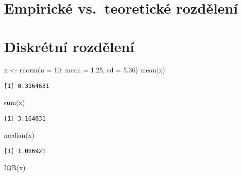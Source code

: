 \documentclass[
  letterpaper,
  DIV=11,
  numbers=noendperiod]{scrreprt}
\newenvironment{Shaded}{\begin{snugshade}}{\end{snugshade}}
\newcommand{\AttributeTok}[1]{\textcolor[rgb]{0.40,0.45,0.13}{#1}}
\newcommand{\DecValTok}[1]{\textcolor[rgb]{0.68,0.00,0.00}{#1}}
\newcommand{\FloatTok}[1]{\textcolor[rgb]{0.68,0.00,0.00}{#1}}
\newcommand{\FunctionTok}[1]{\textcolor[rgb]{0.28,0.35,0.67}{#1}}
\newcommand{\NormalTok}[1]{\textcolor[rgb]{0.00,0.23,0.31}{#1}}
\newcommand{\OtherTok}[1]{\textcolor[rgb]{0.00,0.23,0.31}{#1}}
\begin{document}
\hypertarget{empirickuxe9-vs.-teoretickuxe9-rozdux11blenuxed}{%
\section{Empirické vs.~teoretické
rozdělení}\label{empirickuxe9-vs.-teoretickuxe9-rozdux11blenuxed}}

\hypertarget{diskruxe9tnuxed-rozdux11blenuxed}{%
\section{Diskrétní rozdělení}\label{diskruxe9tnuxed-rozdux11blenuxed}}

\begin{Shaded}
\begin{Highlighting}[]
\NormalTok{x }\OtherTok{\textless{}{-}} \FunctionTok{rnorm}\NormalTok{(}\AttributeTok{n =} \DecValTok{10}\NormalTok{, }\AttributeTok{mean =} \FloatTok{1.25}\NormalTok{, }\AttributeTok{sd =} \FloatTok{5.36}\NormalTok{)}
\FunctionTok{mean}\NormalTok{(x)}
\end{Highlighting}
\end{Shaded}

\begin{verbatim}
[1] 0.3164631
\end{verbatim}

\begin{Shaded}
\begin{Highlighting}[]
\FunctionTok{sum}\NormalTok{(x)}
\end{Highlighting}
\end{Shaded}

\begin{verbatim}
[1] 3.164631
\end{verbatim}

\begin{Shaded}
\begin{Highlighting}[]
\FunctionTok{median}\NormalTok{(x)}
\end{Highlighting}
\end{Shaded}

\begin{verbatim}
[1] 1.086921
\end{verbatim}

\begin{Shaded}
\begin{Highlighting}[]
\FunctionTok{IQR}\NormalTok{(x)}
\end{Highlighting}
\end{Shaded}
\end{document}
